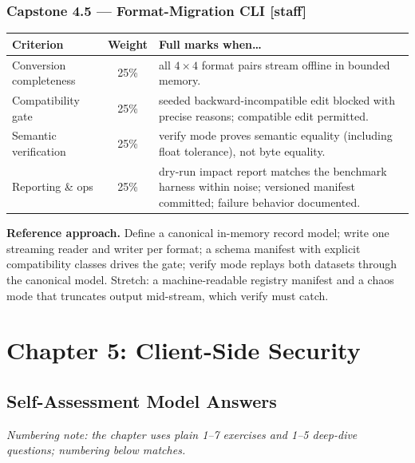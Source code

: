 \subsubsection*{Capstone 4.5 --- Format-Migration CLI [staff]}
\begin{center}\small
\begin{tabularx}{\textwidth}{l c X}
\toprule
\textbf{Criterion} & \textbf{Weight} & \textbf{Full marks when\ldots} \\
\midrule
Conversion completeness & 25\% & all $4\times4$ format pairs stream offline in bounded memory. \\
Compatibility gate & 25\% & seeded backward-incompatible edit blocked with precise reasons; compatible edit permitted. \\
Semantic verification & 25\% & verify mode proves semantic equality (including float tolerance), not byte equality. \\
Reporting \& ops & 25\% & dry-run impact report matches the benchmark harness within noise; versioned manifest committed; failure behavior documented. \\
\bottomrule
\end{tabularx}
\end{center}
\textbf{Reference approach.} Define a canonical in-memory record model;
write one streaming reader and writer per format; a schema manifest with
explicit compatibility classes drives the gate; verify mode replays both
datasets through the canonical model. Stretch: a machine-readable registry
manifest and a chaos mode that truncates output mid-stream, which verify
must catch.

\section{Chapter 5: Client-Side Security}
\label{sec:sol-ch5}

\subsection{Self-Assessment Model Answers}

\emph{Numbering note: the chapter uses plain 1--7 exercises and 1--5
deep-dive questions; numbering below matches.}

